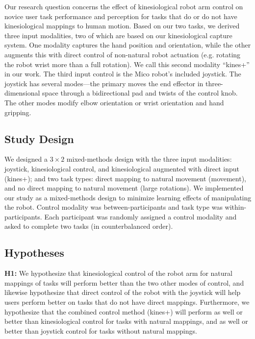 \documentclass{sigchi}
\begin{document}
Our research question concerns the effect of kinesiological robot arm control on novice user task performance and perception for tasks that do or do not have kinesiological mappings to human motion.  Based on our two tasks, we derived three input modalities, two of which are based on our kinesiological capture system.  One modality captures the hand position and orientation, while the other augments this with direct control of non-natural robot actuation (e.g. rotating the robot wrist more than a full rotation).  We call this second modality ``kines+'' in our work. The third input control is the Mico robot's included joystick.  The joystick has several modes---the primary moves the end effector in three-dimensional space through a bidirectional pad and twists of the control knob.  The other modes modify elbow orientation or wrist orientation and hand gripping.  

\subsection{Study Design}

We designed a $3\times2$ mixed-methods design with the three input modalities: joystick, kinesiological control, and kinesiological augmented with direct input (kines+); and two task types: direct mapping to natural movement (movement), and no direct mapping to natural movement (large rotations).  We implemented our study as a mixed-methods design to minimize learning effects of manipulating the robot. Control modality was between-participants and task type was within-participants. Each participant was randomly assigned a control modality and asked to complete two tasks (in counterbalanced order).

\subsection{Hypotheses}

\textbf{H1:} We hypothesize that kinesiological control of the robot arm for natural mappings of tasks will perform better than the two other modes of control, and likewise hypothesize that direct control of the robot with the joystick will help users perform better on tasks that do not have direct mappings. Furthermore, we hypothesize that the combined control method (kines+) will perform as well or better than kinesiological control for tasks with natural mappings, and as well or better than joystick control for tasks without natural mappings.
\end{document}
